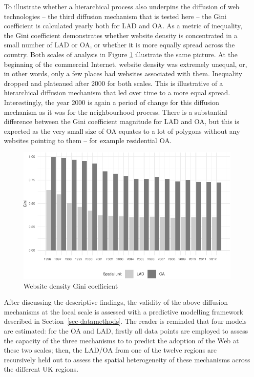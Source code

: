 \documentclass[
  authoryear,
  preprint,
  3p]{elsarticle}
\begin{document}
To illustrate whether a hierarchical process also underpins the
diffusion of web technologies -- the third diffusion mechanism that is
tested here -- the Gini coefficient is calculated yearly both for LAD
and OA. As a metric of inequality, the Gini coefficient demonstrates
whether website density is concentrated in a small number of LAD or OA,
or whether it is more equally spread across the country. Both scales of
analysis in Figure \ref{gini} illustrate the same picture. At the
beginning of the commercial Internet, website density was extremely
unequal, or, in other words, only a few places had websites associated
with them. Inequality dropped and plateaued after 2000 for both scales.
This is illustrative of a hierarchical diffusion mechanism that led over
time to a more equal spread. Interestingly, the year 2000 is again a
period of change for this diffusion mechanism as it was for the
neighbourhood process. There is a substantial difference between the
Gini coefficient magnitude for LAD and OA, but this is expected as the
very small size of OA equates to a lot of polygons without any websites
pointing to them -- for example residential OA.

\begin{figure}[H]

{\centering \includegraphics[width=1\textwidth,height=\textheight]{tranos2025_files/figure-pdf/gini-1.pdf}

}

\caption{\label{gini}Website density Gini coefficient}

\end{figure}%

After discussing the descriptive findings, the validity of the above
diffusion mechanisms at the local scale is assessed with a predictive
modelling framework described in Section~\ref{sec-datamethods}. The
reader is reminded that four models are estimated: for the OA and LAD,
firstly all data points are employed to assess the capacity of the three
mechanisms to to predict the adoption of the Web at these two scales;
then, the LAD/OA from one of the twelve regions are recursively held out
to assess the spatial heterogeneity of these mechanisms across the
different UK regions.
\end{document}
